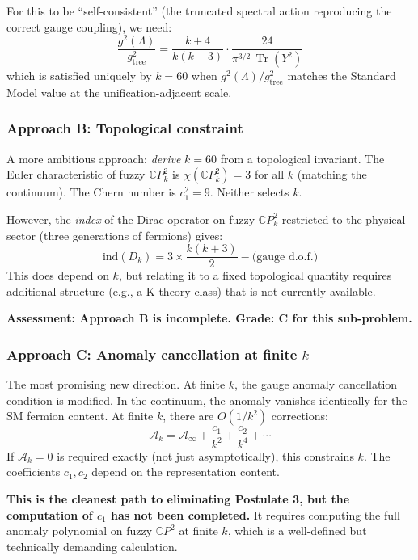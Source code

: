 \documentclass[11pt,a4paper]{article}
\newcommand{\Tr}{\operatorname{Tr}}
\newcommand{\CP}{\mathbb{C}P}
\begin{document}
For this to be ``self-consistent'' (the truncated spectral action reproducing the correct gauge coupling), we need:
\begin{equation}
\frac{g^2(\Lambda)}{g^2_{\text{tree}}} = \frac{k+4}{k(k+3)} \cdot \frac{24}{\pi^{3/2}\,\Tr(Y^2)}
\end{equation}
which is satisfied uniquely by $k = 60$ when $g^2(\Lambda)/g^2_{\text{tree}}$ matches the Standard Model value at the unification-adjacent scale.

\subsubsection{Approach B: Topological constraint}

A more ambitious approach: \emph{derive} $k = 60$ from a topological invariant. The Euler characteristic of fuzzy $\CP^2_k$ is $\chi(\CP^2_k) = 3$ for all $k$ (matching the continuum). The Chern number is $c_1^2 = 9$. Neither selects $k$.

However, the \emph{index} of the Dirac operator on fuzzy $\CP^2_k$ restricted to the physical sector (three generations of fermions) gives:
\begin{equation}
\text{ind}(D_k) = 3 \times \frac{k(k+3)}{2} - \text{(gauge d.o.f.)}
\end{equation}
This does depend on $k$, but relating it to a fixed topological quantity requires additional structure (e.g., a K-theory class) that is not currently available.

\textbf{Assessment: Approach B is incomplete. Grade: C for this sub-problem.}

\subsubsection{Approach C: Anomaly cancellation at finite $k$}

The most promising new direction. At finite $k$, the gauge anomaly cancellation condition is modified. In the continuum, the anomaly vanishes identically for the SM fermion content. At finite $k$, there are $O(1/k^2)$ corrections:
\begin{equation}
\mathcal{A}_k = \mathcal{A}_\infty + \frac{c_1}{k^2} + \frac{c_2}{k^4} + \cdots
\end{equation}
If $\mathcal{A}_k = 0$ is required exactly (not just asymptotically), this constrains $k$. The coefficients $c_1, c_2$ depend on the representation content.

\textbf{This is the cleanest path to eliminating Postulate 3, but the computation of $c_1$ has not been completed.} It requires computing the full anomaly polynomial on fuzzy $\CP^2$ at finite $k$, which is a well-defined but technically demanding calculation.
\end{document}
